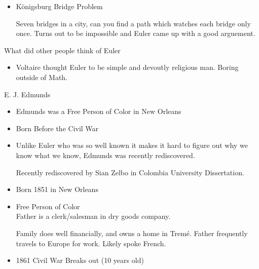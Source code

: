 \documentclass{report}
\begin{document}
\begin{description}
\begin{mdframed}
\begin{itemize}
                \item K\"onigsburg Bridge Problem
                    \begin{mdframed}
                        Seven bridges in a city, can you
                        find a path which watches each bridge
                        only once. Turns out to be impossible
                        and Euler came up with a good arguement.
                    \end{mdframed}
            \end{itemize}
            {\large What did other people think of Euler}
            \begin{itemize}
                \item Voltaire thought Euler to be simple and
                    devoutly religious man. Boring outside
                    of Math.
            \end{itemize}
        \end{mdframed}
    \item E. J. Edmunds
        \begin{mdframed}
            \begin{itemize}
                \item Edmunds was a Free Person of Color
                    in New Orleans
                \item Born Before the Civil War
                \item Unlike Euler who was so well known it
                    makes it hard to figure out why we know what
                    we know, Edmunds was recently rediscovered.
                    \begin{mdframed}
                        Recently rediscovered by Sian Zelbo in
                        Colombia University Dissertation.
                    \end{mdframed}
                \item Born 1851 in New Orleans
                \item Free Person of Color\\
                    Father is a clerk/salesman in dry goods
                    company.
                    \begin{mdframed}
                        Family does well financially, and owns
                        a home in Trem\'e. Father frequently
                        travels to Europe for work. Likely
                        spoke French.
                    \end{mdframed}
                \item 1861 Civil War Breaks out (10 years old)

\end{itemize}
\end{mdframed}
\end{description}
\end{document}
